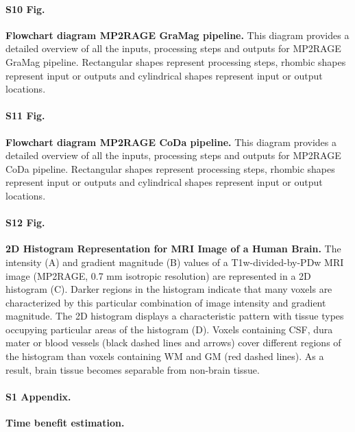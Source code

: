 \paragraph{S10 Fig.}
\label{S10_Fig}
{\bf Flowchart diagram MP2RAGE GraMag pipeline.} This diagram provides a detailed overview of all the inputs, processing steps and outputs for MP2RAGE GraMag pipeline. Rectangular shapes represent processing steps, rhombic shapes represent input or outputs and cylindrical shapes represent input or output locations.

\paragraph{S11 Fig.}
\label{S11_Fig}
{\bf Flowchart diagram MP2RAGE CoDa pipeline.} This diagram provides a detailed overview of all the inputs, processing steps and outputs for MP2RAGE CoDa pipeline. Rectangular shapes represent processing steps, rhombic shapes represent input or outputs and cylindrical shapes represent input or output locations.

\paragraph{S12 Fig.}
\label{S12_Fig}
{\bf 2D Histogram Representation for MRI Image of a Human Brain.} The intensity (A) and gradient magnitude (B) values of a T1w-divided-by-PDw MRI image (MP2RAGE, 0.7 mm isotropic resolution) are represented in a 2D histogram (C). Darker regions in the histogram indicate that many voxels are characterized by this particular combination of image intensity and gradient magnitude. The 2D histogram displays a characteristic pattern with tissue types occupying particular areas of the histogram (D). Voxels containing CSF, dura mater or blood vessels (black dashed lines and arrows) cover different regions of the histogram than voxels containing WM and GM (red dashed lines). As a result, brain tissue becomes separable from non-brain tissue.

\paragraph{S1 Appendix.}
\label{S1_Appendix}
{\bf Time benefit estimation.}

